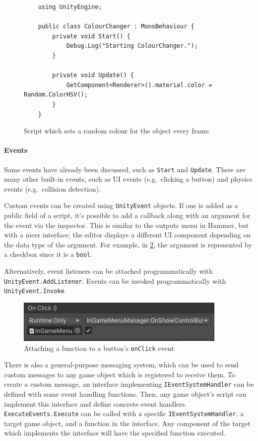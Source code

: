 \documentclass[a4paper, 12pt]{scrartcl}
\begin{document}
\begin{figure}[!htb]
  \begin{verbatim}
    using UnityEngine;

    public class ColourChanger : MonoBehaviour {
        private void Start() {
            Debug.Log("Starting ColourChanger.");
        }

        private void Update() {
            GetComponent<Renderer>().material.color = Random.ColorHSV();
        }
    }
  \end{verbatim}
  \caption{Script which sets a random colour for the object every frame}
  \label{fig:unity_script}
\end{figure}

\paragraph{Events}
Some events have already been discussed, such as \texttt{Start} and \texttt{Update}. There are many other built-in events, such as UI events (e.g.\ clicking a button) and physics events (e.g.\ collision detection).

Custom events can be created using \texttt{UnityEvent} objects. If one is added as a public field of a script, it's possible to add a callback along with an argument for the event via the inspector. This is similar to the outputs menu in Hammer, but with a nicer interface; the editor displays a different UI component depending on the data type of the argument. For example, in \cref{fig:unity_event_inspector}, the argument is represented by a checkbox since it is a \texttt{bool}.

Alternatively, event listeners can be attached programmatically with \texttt{UnityEvent\-.AddListener}. Events can be invoked programmatically with \texttt{UnityEvent.Invoke}.

\begin{figure}[!htb]
  \centering
  \includegraphics[scale=0.75]{images/unity_event_inspector.png}
  \caption{Attaching a function to a button's \texttt{onClick} event}
  \label{fig:unity_event_inspector}
\end{figure}

There is also a general-purpose messaging system, which can be used to send custom messages to any game object which is registered to receive them. To create a custom message, an interface implementing \texttt{IEventSystemHandler} can be defined with some event handling functions. Then, any game object's script can implement this interface and define concrete event handlers. \texttt{ExecuteEvents.Execute} can be called with a specific \texttt{IEventSystemHandler}, a target game object, and a function in the interface. Any component of the target which implements the interface will have the specified function executed.
\end{document}
